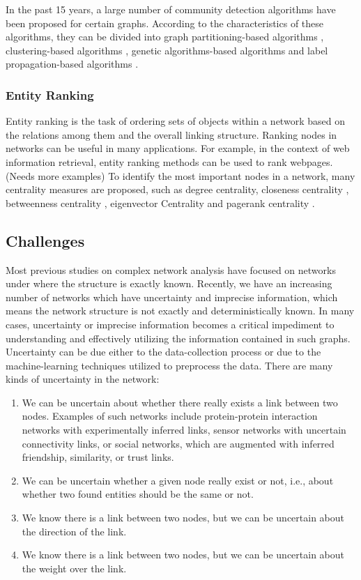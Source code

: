 \documentclass[\main/thesis.tex]{subfiles}
\begin{document}
In the past 15 years, a large number of community detection algorithms have been proposed for certain graphs. According to the characteristics of these algorithms, they can be divided into graph partitioning-based algorithms \cite{kernighan1970efficient,newman2013community}, clustering-based algorithms \cite{girvan2002community,newman2004fast,blondel2008fast,clauset2004finding}, genetic algorithms-based algorithms \cite{pizzuti2008ga} and label propagation-based algorithms \cite{raghavan2007near}.

\subsubsection{Entity Ranking}
Entity ranking is the task of ordering sets of objects within a network based on the relations among them and the overall linking structure. Ranking nodes in networks can be useful in many applications. For example, in the context of web information retrieval, entity ranking methods can be used to rank webpages. (Needs more examples) To identify the most important nodes in a network, many centrality measures are proposed, such as degree centrality, closeness centrality \cite{freeman1978centrality}, betweenness centrality \cite{freeman1977set}, eigenvector Centrality \cite{bonacich1987power} and pagerank centrality \cite{page1999pagerank}.

\subsection{Challenges} \label{challenges}
Most previous studies on complex network analysis have focused on networks under where the structure is exactly known. Recently, we have an increasing number of networks which have uncertainty and imprecise information, which means the network structure is not exactly and deterministically known. In many cases, uncertainty or imprecise information becomes a critical impediment to understanding and effectively utilizing the information contained in such graphs. Uncertainty can be due either to the data-collection process or due to the machine-learning techniques utilized to preprocess the data. There are many kinds of uncertainty in the network:

\begin{enumerate}
\item We can be uncertain about whether there really exists a link between two nodes. Examples of such networks  include  protein-protein  interaction  networks  with experimentally inferred links, sensor networks with  uncertain  connectivity  links,  or  social  networks, which are augmented with inferred friendship, similarity, or trust links. 
\item We can be uncertain whether a given node really exist or not, i.e., about whether two found entities should be the same or not.
\item We know there is a link between two nodes, but we can be uncertain about the direction of the link.
\item We know there is a link between two nodes, but we can be uncertain about the weight over the link.
\end{enumerate}
\end{document}
